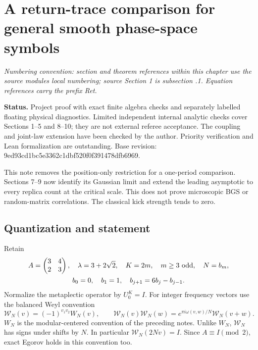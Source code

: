 \hypertarget{a-return-trace-comparison-for-general-smooth-phase-space-symbols}{%
\section{A return-trace comparison for general smooth phase-space symbols}\label{a-return-trace-comparison-for-general-smooth-phase-space-symbols}}
\par\smallskip\noindent\emph{Numbering convention: section and theorem references within this chapter use the source module\textquotesingle s local numbering; source Section 1 is subsection \thesection.1. Equation references carry the prefix Ret.}\par\smallskip

\textbf{Status.} Project proof with exact finite algebra checks and separately
labelled floating physical diagnostics. Limited independent internal
analytic checks cover Sections 1--5 and 8--10; they are not external referee
acceptance. The coupling and joint-law extension have been checked by the author.
Priority verification and Lean formalization are outstanding. Base revision:
9ed93cd1bc5e3362c1dbf520f0f391478dfb6969.

This note removes the position-only restriction for a one-period comparison.
Sections 7--9 now identify its Gaussian limit and extend the leading
asymptotic to every replica count at the critical scale. This does not prove
microscopic BGS or random-matrix correlations. The classical kick strength
tends to zero.

\hypertarget{quantization-and-statement}{%
\subsection{Quantization and statement}\label{quantization-and-statement}}

Retain
\[
 \begin{gathered}
 A=\begin{pmatrix}3&4\\2&3\end{pmatrix},\quad
 \lambda=3+2\sqrt2,\quad K=2m,\quad m\ge3\ \hbox{odd},\quad N=b_m,
 \\ b_0=0,\quad b_1=1,\quad b_{j+1}=6b_j-b_{j-1}.
 \end{gathered}
\]
Normalize the metaplectic operator by \(U_0^K=I\).
For integer frequency vectors use the balanced Weyl convention
\[
 \mathcal W_N(v)=(-1)^{v_1v_2}W_N(v),\qquad
 \mathcal W_N(v)\mathcal W_N(w)
       =e^{\pi i\omega(v,w)/N}\mathcal W_N(v+w).             \tag{Ret.P1}
\]
\(W_N\) is the modular-centered convention of the preceding notes.
Unlike \(W_N\), \(\mathcal W_N\) has signs under shifts by \(N\).
In particular \(\mathcal W_N(2Nv)=I\).
Since \(A\equiv I\pmod2\), exact Egorov holds in this convention too.

